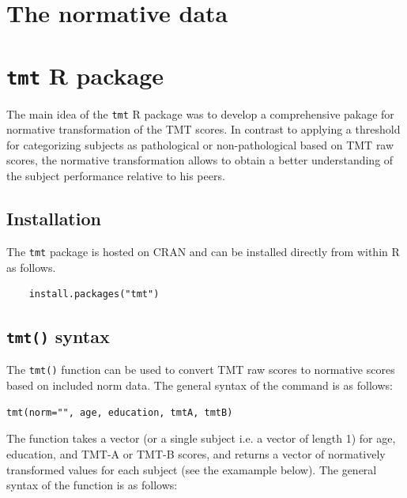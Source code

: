 \documentclass[]{article}
\begin{document}
\section{The normative data}
	
	
	
	
	
	
	
\section{\texttt{tmt} R package}

The main idea of the \texttt{tmt} R package was to develop a comprehensive pakage for normative transformation of the TMT scores. In contrast to applying a threshold for categorizing subjects as pathological or non-pathological based on TMT raw scores, the normative transformation allows to obtain a better understanding of the subject performance relative to his peers. 


\subsection{Installation}

The \texttt{tmt} package is hosted on CRAN and can be installed directly from within R as follows.

\begin{verbatim}
    install.packages("tmt")
\end{verbatim}

\subsection{\texttt{tmt()} syntax}

The \texttt{tmt()} function can be used to convert TMT raw scores to normative scores based on included norm data. The general syntax of the command is as follows:

\begin{verbatim}
tmt(norm="", age, education, tmtA, tmtB)
\end{verbatim}

The function takes a vector (or a single subject i.e. a vector of length 1) for age, education, and TMT-A or TMT-B scores, and returns a vector of normatively transformed values for each subject (see the examample below). The general syntax of the function is as follows:
\end{document}
